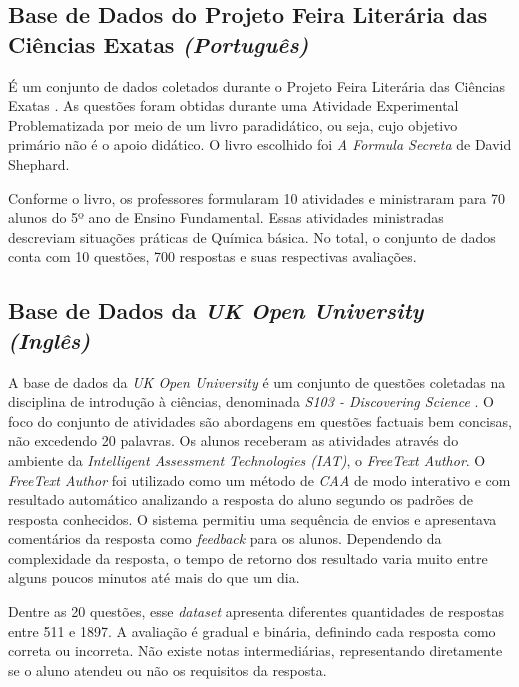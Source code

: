 \subsection{Base de Dados do Projeto Feira Literária das Ciências Exatas \textit{(Português)}}
\label{findes-db}

É um conjunto de dados coletados durante o Projeto Feira Literária das Ciências Exatas \cite{nascimento2020}. As questões foram obtidas durante uma Atividade Experimental Problematizada por meio de um livro paradidático, ou seja, cujo objetivo primário não é o apoio didático. O livro escolhido foi \textit{A Formula Secreta} de David Shephard. 

Conforme o livro, os professores formularam 10 atividades e ministraram para 70 alunos do 5º ano de Ensino Fundamental. Essas atividades ministradas descreviam situações práticas de Química básica. No total, o conjunto de dados conta com 10 questões, 700 respostas e suas respectivas avaliações.

\subsection{Base de Dados da \textit{UK Open University} \textit{(Inglês)}}
\label{openunv-db}

A base de dados da \textit{UK Open University} é um conjunto de questões coletadas na disciplina de introdução à ciências, denominada \textit{S103 - Discovering Science} \cite{jordan2012}. O foco do conjunto de atividades são abordagens em questões factuais bem concisas, não excedendo 20 palavras. Os alunos receberam as atividades através do ambiente da \textit{Intelligent Assessment Technologies (IAT)}, o \textit{FreeText Author}. O \textit{FreeText Author} foi utilizado como um método de \textit{CAA} de modo interativo e com resultado automático analizando a resposta do aluno segundo os padrões de resposta conhecidos. O sistema permitiu uma sequência de envios e apresentava comentários da resposta como \textit{feedback} para os alunos. Dependendo da complexidade da resposta, o tempo de retorno dos resultado varia muito entre alguns poucos minutos até mais do que um dia.

Dentre as 20 questões, esse \textit{dataset} apresenta diferentes quantidades de respostas entre 511 e 1897. A avaliação é gradual e binária, definindo cada resposta como correta ou incorreta. Não existe notas intermediárias, representando diretamente se o aluno atendeu ou não os requisitos da resposta.

